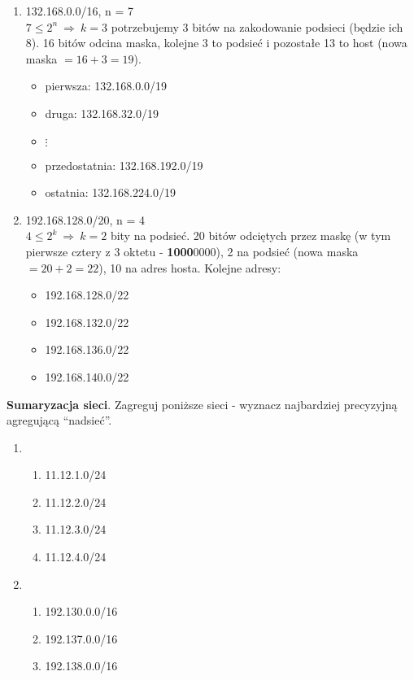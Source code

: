 \documentclass[main.tex]{subfiles}
\begin{document}
    \begin{enumerate}
        \item 132.168.0.0/16, n = 7\\
        $7 \leq 2^n ~ \Rightarrow ~ k = 3$ potrzebujemy 3 bitów na zakodowanie podsieci (będzie ich 8). 16 bitów odcina
        maska, kolejne 3 to podsieć i pozostałe 13 to host (nowa maska $= 16 + 3 = 19$).
        \begin{itemize}
            \item pierwsza: 132.168.0.0/19
            \item druga: 132.168.32.0/19
            \item $\vdots$
            \item przedostatnia: 132.168.192.0/19
            \item ostatnia: 132.168.224.0/19
        \end{itemize}

        \item 192.168.128.0/20, n = 4\\
        $4 \leq 2^k ~ \Rightarrow ~ k = 2$ bity na podsieć. 20 bitów odciętych przez maskę (w tym pierwsze cztery
        z 3 oktetu - \textbf{1000}0000), 2 na podsieć (nowa maska $=20+2=22$), 10 na adres hosta. Kolejne adresy:
        \begin{itemize}
            \item 192.168.128.0/22
            \item 192.168.132.0/22
            \item 192.168.136.0/22
            \item 192.168.140.0/22
        \end{itemize}
    \end{enumerate}

    \begin{exercise}
        \textbf{Sumaryzacja sieci}. Zagreguj poniższe sieci - wyznacz najbardziej precyzyjną agregującą ``nadsieć''.
        \begin{enumerate}
            \item
            \begin{enumerate}[label=(\Alph*)]
                \item 11.12.1.0/24
                \item 11.12.2.0/24
                \item 11.12.3.0/24
                \item 11.12.4.0/24
            \end{enumerate}
            \item
            \begin{enumerate}[label=(\Alph*)]
                \item 192.130.0.0/16
                \item 192.137.0.0/16
                \item 192.138.0.0/16
            \end{enumerate}
        \end{enumerate}
    \end{exercise}
\end{document}
